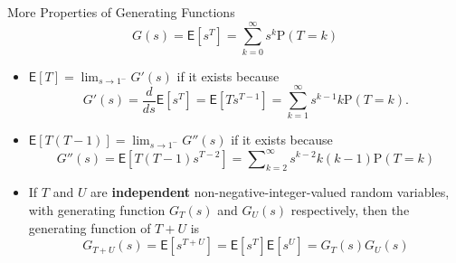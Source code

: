 \documentclass[letterpaper, mathserif]{beamer}
\def\p{\mathrm P}
\def\E{\mathsf E}
\def\Sum{\sum\nolimits}
\begin{document}
\begin{frame}{More Properties of Generating Functions}
\[
G(s)=\E[s^T]=\sum_{k=0}^\infty s^k\p(T=k)
\]
\begin{itemize}
\item $\E[T]=\lim_{s\to1^-} G'(s)$ if it exists because
$$G'(s)=\frac{d}{ds}\E[s^T]=\E[Ts^{T-1}]=\sum_{k=1}^\infty s^{k-1}k\p(T=k).$$

\item $\E[T(T-1)]=\lim_{s\to1^-} G''(s)$ if it exists because
$$G''(s)=\E[T(T-1)s^{T-2}]=\Sum_{k=2}^\infty s^{k-2}k(k-1)\p(T=k)$$
\item If $T$ and $U$ are \textbf{independent}  non-negative-integer-valued random variables, with generating function $G_T(s)$ and $G_U(s)$ respectively, then the generating function of $T+U$ is
    $$G_{T+U}(s)=\E[s^{T+U}]=\E[s^{T}]\E[s^{U}]=G_T(s)G_U(s)$$
\end{itemize}
\end{frame}
\end{document}
